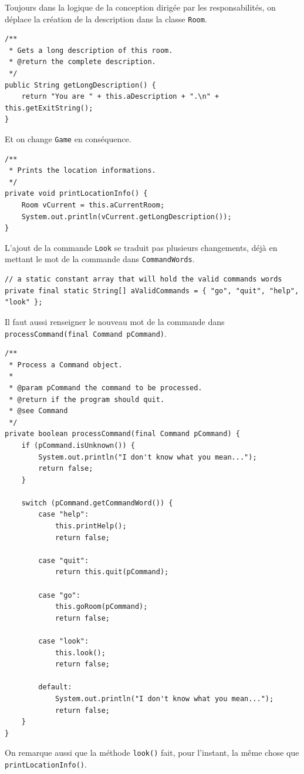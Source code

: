 \documentclass[a4paper,12pt]{report}
\begin{document}
\begin{exercise}[subtitle=getLongDescription]

Toujours dans la logique de la conception dirigée par les responsabilités, on déplace la création de la description dans la classe \verb|Room|.

\begin{verbatim}
/**
 * Gets a long description of this room.
 * @return the complete description.
 */
public String getLongDescription() {
    return "You are " + this.aDescription + ".\n" + this.getExitString();
}
\end{verbatim}

Et on change \verb|Game| en conséquence.

\begin{verbatim}
/**
 * Prints the location informations.
 */
private void printLocationInfo() {
    Room vCurrent = this.aCurrentRoom;
    System.out.println(vCurrent.getLongDescription());
}
\end{verbatim}
\end{exercise}

\setcounter{exercise}{13}

\begin{exercise}[subtitle=look]

L'ajout de la commande \verb|Look| se traduit pas plusieurs changements, déjà en mettant le mot de la commande dans \verb|CommandWords|.

\begin{verbatim}
// a static constant array that will hold the valid commands words
private final static String[] aValidCommands = { "go", "quit", "help", "look" };
\end{verbatim}

Il faut aussi renseigner le nouveau mot de la commande dans \texttt{processCommand(final Command pCommand)}.

\begin{verbatim}
/**
 * Process a Command object.
 *
 * @param pCommand the command to be processed.
 * @return if the program should quit.
 * @see Command
 */
private boolean processCommand(final Command pCommand) {
    if (pCommand.isUnknown()) {
        System.out.println("I don't know what you mean...");
        return false;
    }

    switch (pCommand.getCommandWord()) {
        case "help":
            this.printHelp();
            return false;

        case "quit":
            return this.quit(pCommand);

        case "go":
            this.goRoom(pCommand);
            return false;

        case "look":
            this.look();
            return false;

        default:
            System.out.println("I don't know what you mean...");
            return false;
    }
}
\end{verbatim}

On remarque aussi que la méthode \verb|look()| fait, pour l'instant, la même chose que \verb|printLocationInfo()|. 
\end{exercise}
\end{document}
